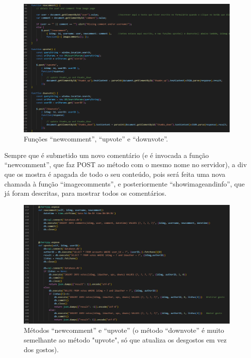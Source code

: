 \documentclass{report}
\begin{document}
\begin{figure}[!hbtp]
        \centering
        \includegraphics[scale=0.46]{Images_code/11 - js image 3.png}
        \caption{\label{Estrutura}Funções “newcomment”, “upvote” e “downvote”.}
\end{figure}


 Sempre que é submetido um novo comentário (e é invocada a função “newcomment”, que faz POST  ao método com o mesmo nome no servidor), a div que os mostra é apagada de todo o seu conteúdo, pois será feita uma nova chamada à função “imagecomments”, e posteriormente “showimageandinfo”, que já foram descritas, para mostrar todos os comentários.

 \newpage


 \begin{figure}[!hbtp]
        \centering
        \includegraphics[scale=0.46]{Images_code/11 - newcomments.png}
        \caption{\label{Estrutura}Métodos “newcomment” e “upvote” (o método “downvote” é muito semelhante ao método "upvote", só que atualiza os desgostos em vez dos gostos).}
\end{figure}
\end{document}
